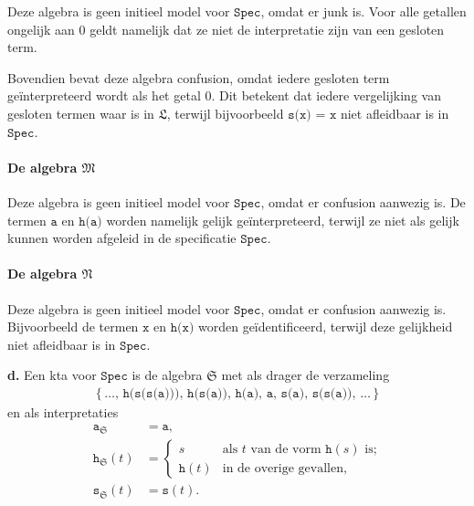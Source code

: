 \documentclass[a4paper,11pt]{article}
\begin{document}
\begin{description}
Deze algebra is geen initieel model voor $\texttt{Spec}$, omdat er junk
is. Voor alle getallen ongelijk aan 0 geldt namelijk dat ze niet de
interpretatie zijn van een gesloten term.

Bovendien bevat deze algebra confusion, omdat iedere gesloten term
ge\"interpreteerd wordt als het getal 0. Dit betekent dat iedere vergelijking
van gesloten termen waar is in $\mathfrak{L}$, terwijl bijvoorbeeld
$\texttt{s(x) = x}$ niet afleidbaar is in $\texttt{Spec}$.

\paragraph{De algebra $\mathfrak{M}$}

Deze algebra is geen initieel model voor $\texttt{Spec}$, omdat er confusion
aanwezig is. De termen $\texttt{a}$ en $\texttt{h(a)}$ worden namelijk gelijk
ge\"interpreteerd, terwijl ze niet als gelijk kunnen worden afgeleid in de
specificatie $\texttt{Spec}$.

\paragraph{De algebra $\mathfrak{N}$}

Deze algebra is geen initieel model voor $\texttt{Spec}$, omdat er
confusion aanwezig is. Bijvoorbeeld de termen $\texttt{x}$ en $\texttt{h(x)}$
worden ge\"identificeerd, terwijl deze gelijkheid niet afleidbaar is in
$\texttt{Spec}$.

\item{\bf d.}
Een kta voor $\texttt{Spec}$ is de algebra $\mathfrak{S}$ met als drager de
verzameling
\begin{align*}
\{\, \ldots, \, \texttt{h(s(s(a)))}, \, \texttt{h(s(a))}, \, \texttt{h(a)}, \, \texttt{a}, \, \texttt{s(a)}, \, \texttt{s(s(a))}, \, \ldots \, \}
\end{align*}
en als interpretaties
\begin{align*}
\texttt{a}_{\mathfrak{S}}               &= \texttt{a}, \\
\texttt{h}_{\mathfrak{S}}(t) &= \begin{cases}
  s             & \text{als $t$ van de vorm $\texttt{h}(s)$ is;} \\
  \texttt{h}(t) & \text{in de overige gevallen,}
\end{cases} \\
\texttt{s}_{\mathfrak{S}}(t)       &= \texttt{s}(t).
\end{align*}

\end{description}
\end{document}

